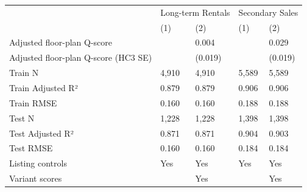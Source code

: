 \begin{tabular}{lllll}
\toprule
 & \multicolumn{2}{r}{Long-term Rentals} & \multicolumn{2}{r}{Secondary Sales} \\
 & (1) & (2) & (1) & (2) \\
\midrule
Adjusted floor-plan Q-score &  & 0.004 &  & 0.029 \\
Adjusted floor-plan Q-score (HC3 SE) &  & (0.019) &  & (0.019) \\
Train N & 4,910 & 4,910 & 5,589 & 5,589 \\
Train Adjusted R² & 0.879 & 0.879 & 0.906 & 0.906 \\
Train RMSE & 0.160 & 0.160 & 0.188 & 0.188 \\
Test N & 1,228 & 1,228 & 1,398 & 1,398 \\
Test Adjusted R² & 0.871 & 0.871 & 0.904 & 0.903 \\
Test RMSE & 0.160 & 0.160 & 0.184 & 0.184 \\
Listing controls & Yes & Yes & Yes & Yes \\
Variant scores &  & Yes &  & Yes \\
\bottomrule
\end{tabular}
